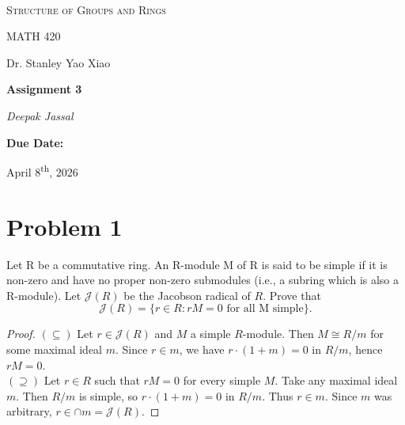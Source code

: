 \documentclass[12pt]{article}
\renewcommand{\author}{Deepak Jassal}
\renewcommand{\coursename}{Structure of Groups and Rings}
\renewcommand{\coursecode}{MATH 420}
\renewcommand{\assignment}{Assignment 3}
\renewcommand{\instructor}{Dr. Stanley Yao Xiao}
\renewcommand{\duedate}{April 8\textsuperscript{th}, 2026}
\begin{document}
\begin{titlepage}
	\centering
	\vspace*{2.0cm}	
	\\
	{\LARGE \textsc{\coursename}\par}
	\vspace{0.5cm}
	{\large\coursecode\par}
    \vspace{0.5cm}
    {\large\instructor\par}
	\vspace{1.5cm}
	{\huge\bfseries\assignment\par}
	\vspace{1cm}  
	{\LARGE\itshape\author\par}
    \vspace{2cm}
	{\large\bfseries Due Date:\par}
	\vspace{0.5cm}
	{\Large \duedate}\\
\end{titlepage}
\section*{Problem 1}
Let R be a commutative ring. An R-module M of R is said to be simple if it is non-zero and have no proper non-zero submodules (i.e., a subring which is also a R-module). Let $\mathcal{J}(R)$ be the Jacobson radical of $R$. Prove that
\[
    \mathcal{J}(R) = \{r \in R : rM = 0 \text{ for all M simple}\}.
\]
\begin{proof}
	$(\subseteq)$ Let $r\in\mathcal{J}(R)$ and $M$ a simple $R$-module. Then $M\cong R/m$ for some maximal ideal $m$. Since $r\in m$, we have $r\cdot(1+m)=0$ in $R/m$, hence $rM=0$.\\
	$(\supseteq)$ Let $r\in R$ such that $rM=0$ for every simple $M$. Take any maximal ideal $m$. Then $R/m$ is simple, so $r\cdot(1+m)=0$ in $R/m$. Thus $r\in m$. Since $m$ was arbitrary, $r\in\cap m=\mathcal{J}(R)$.  
\end{proof}
\end{document}
